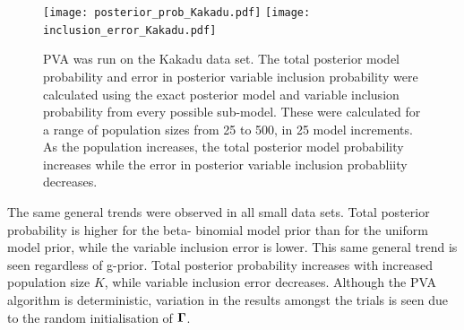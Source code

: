 \begin{figure}[ht!]
	\texttt{[image: posterior\_prob\_Kakadu.pdf]}
	\texttt{[image: inclusion\_error\_Kakadu.pdf]}

	\caption{PVA was run on the Kakadu data set. The total posterior model probability and error in posterior 
						variable inclusion probability were calculated using the exact posterior model and variable  
						inclusion probability from every possible sub-model. These were calculated for a range of 
						population sizes from 25 to 500, in 25 model increments.
						As the population increases, the total posterior model probability increases while the error in 
						posterior variable inclusion probabliity decreases.}
	\label{fig:kakadu_total_posterior_mass}
\end{figure}


The same general trends were observed in all small data sets. Total posterior probability is higher for the
beta- binomial model prior than for the uniform model prior, while the variable inclusion error is lower. This
same general trend is seen regardless of g-prior. Total posterior probability increases with increased
population size $K$, while variable inclusion error decreases. Although the PVA algorithm is deterministic,
variation in the results amongst the trials is seen due to the random initialisation of ${\boldsymbol \Gamma}$.
